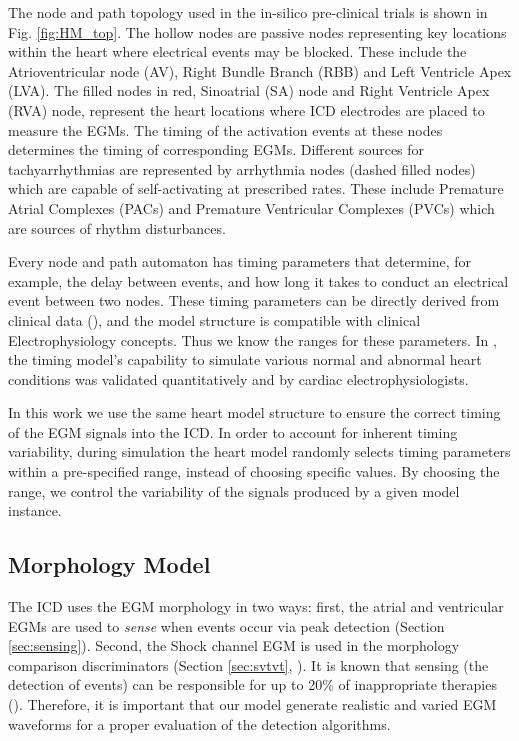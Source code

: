 The node and path topology used in the in-silico pre-clinical trials is shown in Fig. \ref{fig:HM_top}. 
The hollow nodes are passive nodes representing key locations within the heart where electrical events may be blocked. These include the Atrioventricular node (AV), Right Bundle Branch (RBB) and Left Ventricle Apex (LVA). 
The filled nodes in red, Sinoatrial (SA) node and Right Ventricle Apex (RVA) node, represent the heart locations where ICD electrodes are placed to measure the EGMs.
The timing of the activation events at these nodes determines the timing of corresponding EGMs.
Different sources for tachyarrhythmias are represented by arrhythmia nodes (dashed filled nodes) which are capable of self-activating at prescribed rates. These include Premature Atrial Complexes (PACs) and Premature Ventricular Complexes (PVCs) which are sources of rhythm disturbances.

Every node and path automaton has timing parameters that determine, for example, the delay between events, and how long it takes to conduct an electrical event between two nodes.
These timing parameters can be directly derived from clinical data (\cite{josephson}), and the model structure is compatible with clinical Electrophysiology concepts.
Thus we know the ranges for these parameters.
In \cite{VHM_proc}, the timing model's capability to simulate various normal and abnormal heart conditions was validated quantitatively and by cardiac electrophysiologists.


In this work we use the same heart model structure to ensure the correct timing of the EGM signals into the ICD.
In order to account for inherent timing variability, during simulation the heart model randomly selects timing parameters within a pre-specified range, instead of choosing specific values. 
By choosing the range, we control the variability of the signals produced by a given model instance.

\subsection{Morphology Model}
The ICD uses the EGM morphology in two ways:
first, the atrial and ventricular EGMs are used to \emph{sense} when events occur via peak detection (Section \ref{sec:sensing}).
Second, the Shock channel EGM is used in the morphology comparison discriminators (Section \ref{sec:svtvt}, \cite{VTC,Wavelet}).
It is known that sensing (the detection of events) can be responsible for up to 20\% of inappropriate therapies (\cite{wrong_sensing}).
Therefore, it is important that our model generate realistic and varied EGM waveforms for a proper evaluation of the detection algorithms.

